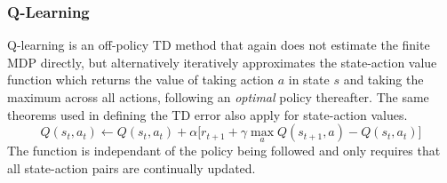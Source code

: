 \subsubsection{Q-Learning}
\label{sec:qlearning}
%
Q-learning is an off-policy TD method that again does not estimate the finite
MDP directly, but alternatively iteratively approximates the state-action value
function which returns the value of taking action $a$ in state $s$ and taking
the maximum across all actions, following an \textit{optimal} policy
thereafter. The same theorems used in defining the TD error also apply for
state-action values.
\begin{equation}
\label{eq:qlearning}
Q(s_t,a_t) \leftarrow Q(s_t,a_t) + \alpha \bigl[r_{t+1} + \gamma\max_a
Q(s_{t+1},a)-Q(s_t,a_t) \bigr]
\end{equation}
The function is independant of the policy being followed and only requires that
all state-action pairs are continually updated.

